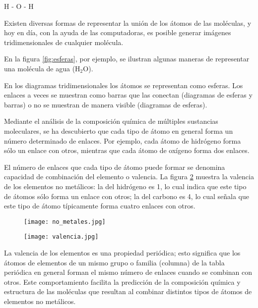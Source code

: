 \begin{center}
    H - O - H
\end{center}

Existen diversas formas de representar la unión de los átomos de las moléculas, y hoy en día,
con la ayuda de las computadoras, es posible generar imágenes tridimensionales de cualquier
molécula.

En la figura \ref{fig:esferas}, por ejemplo,
se ilustran algunas maneras de representar una molécula de agua (H$_2$O).

En los diagramas tridimensionales los átomos se representan como esferas. Los enlaces a
veces se muestran como barras que las conectan (diagramas de esferas y barras) o no se muestran de manera visible (diagramas de esferas).

Mediante el análisis de la composición química de múltiples sustancias moleculares,
se ha descubierto que cada tipo de átomo en general forma un número determinado de enlaces.
Por ejemplo, cada átomo de hidrógeno forma sólo un enlace con otros, mientras que cada
átomo de oxígeno forma dos enlaces.

El número de enlaces que cada tipo de átomo puede
formar se denomina capacidad de combinación del elemento o valencia. La figura \ref{fig:valencia}
muestra la valencia de los elementos no metálicos: la del hidrógeno es 1, lo cual
indica que este tipo de átomos sólo forma un enlace con otros; la del carbono es 4,
lo cual señala que este tipo de átomo típicamente forma cuatro enlaces con otros.

\begin{minipage}{.4\textwidth}
    \begin{figure}[H]
        \centering
        \texttt{[image: no\_metales.jpg]}
        \label{fig:no_metales}
    \end{figure}
\end{minipage}\hfill
\begin{minipage}{.4\textwidth}
    \begin{figure}[H]
        \centering
        \texttt{[image: valencia.jpg]}
        \label{fig:valencia}
    \end{figure}
\end{minipage}

La valencia de los elementos es una propiedad periódica; esto significa que los átomos de elementos de un mismo grupo o familia (columna) de la tabla periódica en general forman el mismo número de enlaces cuando se combinan con otros. Este comportamiento facilita la predicción de la composición química y estructura de las moléculas que resultan al combinar distintos tipos de átomos de elementos no metálicos.

